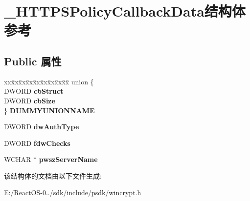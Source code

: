 \hypertarget{struct___h_t_t_p_s_policy_callback_data}{}\section{\+\_\+\+H\+T\+T\+P\+S\+Policy\+Callback\+Data结构体 参考}
\label{struct___h_t_t_p_s_policy_callback_data}
\subsection*{Public 属性}
\begin{DoxyCompactItemize}
\item 
\mbox{\label{struct___h_t_t_p_s_policy_callback_data_acc8f51d2d8c4ee62815438a408bae341}} 
\begin{tabbing}
xx\=xx\=xx\=xx\=xx\=xx\=xx\=xx\=xx\=\kill
union \{\\
\>DWORD {\bfseries cbStruct}\\
\>DWORD {\bfseries cbSize}\\
\} {\bfseries DUMMYUNIONNAME}\\

\end{tabbing}\item 
\mbox{\label{struct___h_t_t_p_s_policy_callback_data_a64a03d07d62229d9aa679064006bb626}} 
D\+W\+O\+RD {\bfseries dw\+Auth\+Type}
\item 
\mbox{\label{struct___h_t_t_p_s_policy_callback_data_a29e87b218bed8f735742cd002a7e1bc9}} 
D\+W\+O\+RD {\bfseries fdw\+Checks}
\item 
\mbox{\label{struct___h_t_t_p_s_policy_callback_data_ae3de934639684cb0119f7842de2afede}} 
W\+C\+H\+AR $\ast$ {\bfseries pwsz\+Server\+Name}
\end{DoxyCompactItemize}


该结构体的文档由以下文件生成\+:\begin{DoxyCompactItemize}
\item 
E\+:/\+React\+O\+S-\/0../sdk/include/psdk/wincrypt.\+h\end{DoxyCompactItemize}
